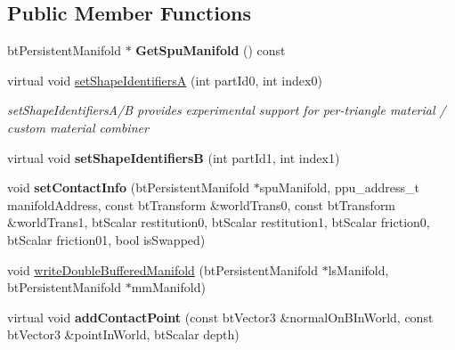 \subsection*{Public Member Functions}
\begin{DoxyCompactItemize}
\item 
\mbox{\label{classSpuContactResult_aa80ee2d8a2ba0951128f11803423fec3}} 
bt\+Persistent\+Manifold $\ast$ {\bfseries Get\+Spu\+Manifold} () const
\item 
\mbox{\label{classSpuContactResult_a7e776f85c0ddf51cfa0b391e82c737d8}} 
virtual void \hyperlink{classSpuContactResult_a7e776f85c0ddf51cfa0b391e82c737d8}{set\+Shape\+IdentifiersA} (int part\+Id0, int index0)
\begin{DoxyCompactList}\small\item\em set\+Shape\+Identifiers\+A/B provides experimental support for per-\/triangle material / custom material combiner \end{DoxyCompactList}\item 
\mbox{\label{classSpuContactResult_af740203419b21a7bd479ed701d85e3e3}} 
virtual void {\bfseries set\+Shape\+IdentifiersB} (int part\+Id1, int index1)
\item 
\mbox{\label{classSpuContactResult_ad7f7b13a470a2ecc15dc220712c38c1c}} 
void {\bfseries set\+Contact\+Info} (bt\+Persistent\+Manifold $\ast$spu\+Manifold, ppu\+\_\+address\+\_\+t manifold\+Address, const bt\+Transform \&world\+Trans0, const bt\+Transform \&world\+Trans1, bt\+Scalar restitution0, bt\+Scalar restitution1, bt\+Scalar friction0, bt\+Scalar friction01, bool is\+Swapped)
\item 
void \hyperlink{classSpuContactResult_a4a8870acdf01594bed6377d450583a95}{write\+Double\+Buffered\+Manifold} (bt\+Persistent\+Manifold $\ast$ls\+Manifold, bt\+Persistent\+Manifold $\ast$mm\+Manifold)
\item 
\mbox{\label{classSpuContactResult_ab92567512f398011215f0a6e0ed6eea6}} 
virtual void {\bfseries add\+Contact\+Point} (const bt\+Vector3 \&normal\+On\+B\+In\+World, const bt\+Vector3 \&point\+In\+World, bt\+Scalar depth)
\item 
\mbox{\label{classSpuContactResult_a800bdacef835a99296beed51a39eb9b5}} 

\end{DoxyCompactItemize}
